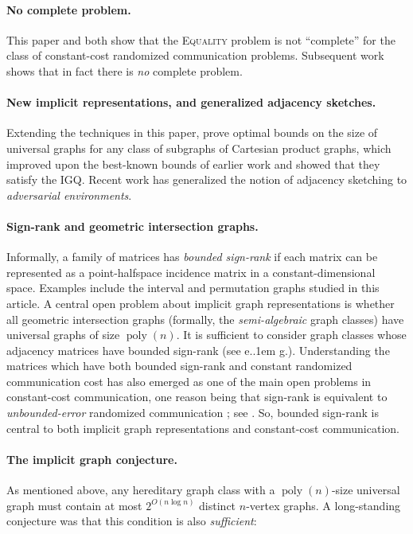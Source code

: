 \documentclass{theoretics}
\makeatletter
\DeclareMathOperator{\poly}{poly}
\newcommand*\eg{e.\kern.1em g.\@\xspace} %
\newcommand*\EQUALITY{\textsc{Equality}\xspace}
\makeatother
\begin{document}
\paragraph*{No complete problem.} This paper and \cite{HHH23dimfree} both show that the \EQUALITY
problem is not ``complete'' for the class of constant-cost randomized communication problems.
Subsequent work \cite{FHHH24} shows that in fact there is \emph{no} complete problem.

\paragraph*{New implicit representations, and generalized adjacency sketches.} Extending the
techniques in this paper, \cite{EHZ23} prove optimal bounds on the size of universal graphs for any
class of subgraphs of Cartesian product graphs, which improved upon the best-known bounds of earlier
work \cite{CLR20} and showed that they satisfy the IGQ. Recent work \cite{NP24} has generalized the
notion of adjacency sketching to \emph{adversarial environments}.

\paragraph*{Sign-rank and geometric intersection graphs.}
Informally, a family of matrices has \emph{bounded sign-rank} if each matrix can be represented as a
point-halfspace incidence matrix in a constant-dimensional space. Examples include the interval and
permutation graphs studied in this article. A central open problem about implicit graph
representations is whether all geometric intersection graphs (formally, the \emph{semi-algebraic}
graph classes) have universal graphs of size $\poly(n)$. It is sufficient to consider graph classes
whose adjacency matrices have bounded sign-rank (see \eg \cite{Spin03,Fit19,HZ23}). Understanding
the matrices which have both bounded sign-rank and constant randomized communication cost has also
emerged as one of the main open problems in constant-cost communication, one reason being that
sign-rank is equivalent to \emph{unbounded-error} randomized communication \cite{PS86}; see
\cite{HHPTZ22,ACHS23,CHHS23,HHM23,HZ23}. So, bounded sign-rank is central to both implicit graph
representations and constant-cost communication.


\paragraph*{The implicit graph conjecture.}
As mentioned above, any hereditary graph class with a $\poly(n)$-size universal graph must
contain at most $2^{O(n \log n)}$ distinct $n$-vertex graphs. A long-standing
conjecture was that this condition is also \emph{sufficient}:\\
\end{document}
